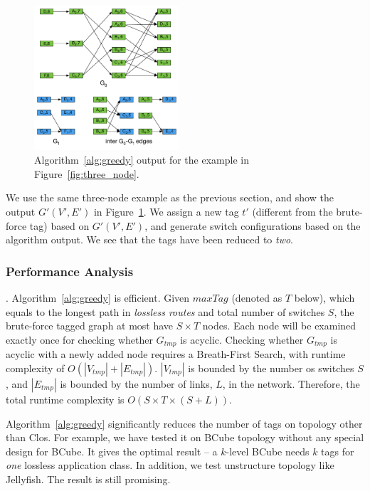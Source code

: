 \begin{figure}[t]
	\centering
	\includegraphics[width=0.48\textwidth] {figs/alo_walkthrough_c}
	\caption{Algorithm~\ref{alg:greedy} output for the example in Figure~\ref{fig:three_node}.}
	\label{fig:greedy}
\end{figure}

We use the same three-node example as the previous section, and show the output 
$G'(V', E')$ in Figure~\ref{fig:greedy}. 
We assign a new tag $t'$ (different from the brute-force tag) based on $G'(V', E')$, 
and generate switch configurations based on the algorithm output. We see that
the tags have been reduced to {\em two}.


\subsubsection{Performance Analysis}\label{subsec:caveats}

. Algorithm~\ref{alg:greedy} is efficient. Given $maxTag$ 
(denoted as $T$ below), which equals to the longest path in {\em lossless routes} and
total number of switches $S$, the brute-force tagged graph at most have $S \times T$ nodes.
Each node will be examined exactly once for checking whether $G_{tmp}$ is acyclic.
Checking whether $G_{tmp}$ is acyclic with a newly added node requires a Breath-First Search,
with runtime complexity of $O(|V_{tmp}| + |E_{tmp}|)$. $|V_{tmp}|$ is bounded by the number
os switches $S$, and $|E_{tmp}|$ is bounded by the number of links, $L$, in the network.
Therefore, the total runtime complexity is $O(S \times T \times (S+L))$.

 Algorithm~\ref{alg:greedy} significantly 
reduces the number of tags on topology other than Clos. For example, we 
have tested it on BCube topology without any special design for BCube. It gives the optimal 
result -- a $k$-level BCube needs $k$ tags for {\em one} lossless application 
class. In addition, we test unstructure topology like Jellyfish. The result is still promising.

